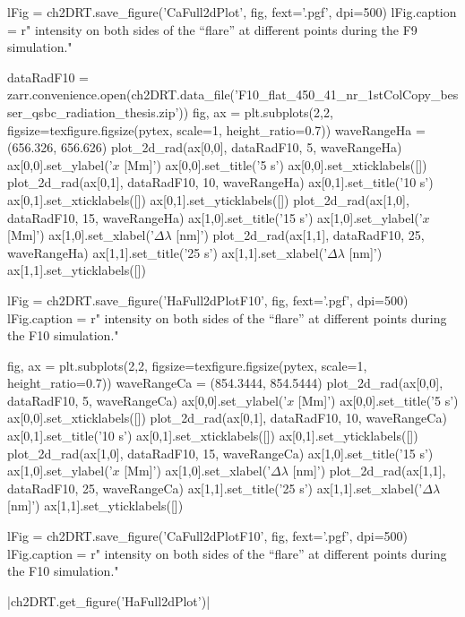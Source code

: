 \begin{pycode}[2DRT]
lFig = ch2DRT.save_figure('CaFull2dPlot', fig, fext='.pgf', dpi=500)
lFig.caption = r"\CaLine{} intensity on both sides of the ``flare'' at different points during the F9 simulation."

dataRadF10 = zarr.convenience.open(ch2DRT.data_file('F10_flat_450_41_nr_1stColCopy_besser_qsbc_radiation_thesis.zip'))
fig, ax = plt.subplots(2,2, figsize=texfigure.figsize(pytex, scale=1, height_ratio=0.7))
waveRangeHa = (656.326, 656.626)
plot_2d_rad(ax[0,0], dataRadF10, 5, waveRangeHa)
ax[0,0].set_ylabel('$x$ [Mm]')
ax[0,0].set_title('5 s')
ax[0,0].set_xticklabels([])
plot_2d_rad(ax[0,1], dataRadF10, 10, waveRangeHa)
ax[0,1].set_title('10 s')
ax[0,1].set_xticklabels([])
ax[0,1].set_yticklabels([])
plot_2d_rad(ax[1,0], dataRadF10, 15, waveRangeHa)
ax[1,0].set_title('15 s')
ax[1,0].set_ylabel('$x$ [Mm]')
ax[1,0].set_xlabel('$\Delta\lambda$ [nm]')
plot_2d_rad(ax[1,1], dataRadF10, 25, waveRangeHa)
ax[1,1].set_title('25 s')
ax[1,1].set_xlabel('$\Delta\lambda$ [nm]')
ax[1,1].set_yticklabels([])

lFig = ch2DRT.save_figure('HaFull2dPlotF10', fig, fext='.pgf', dpi=500)
lFig.caption = r"\Ha{} intensity on both sides of the ``flare'' at different points during the F10 simulation."

fig, ax = plt.subplots(2,2, figsize=texfigure.figsize(pytex, scale=1, height_ratio=0.7))
waveRangeCa = (854.3444, 854.5444)
plot_2d_rad(ax[0,0], dataRadF10, 5, waveRangeCa)
ax[0,0].set_ylabel('$x$ [Mm]')
ax[0,0].set_title('5 s')
ax[0,0].set_xticklabels([])
plot_2d_rad(ax[0,1], dataRadF10, 10, waveRangeCa)
ax[0,1].set_title('10 s')
ax[0,1].set_xticklabels([])
ax[0,1].set_yticklabels([])
plot_2d_rad(ax[1,0], dataRadF10, 15, waveRangeCa)
ax[1,0].set_title('15 s')
ax[1,0].set_ylabel('$x$ [Mm]')
ax[1,0].set_xlabel('$\Delta\lambda$ [nm]')
plot_2d_rad(ax[1,1], dataRadF10, 25, waveRangeCa)
ax[1,1].set_title('25 s')
ax[1,1].set_xlabel('$\Delta\lambda$ [nm]')
ax[1,1].set_yticklabels([])

lFig = ch2DRT.save_figure('CaFull2dPlotF10', fig, fext='.pgf', dpi=500)
lFig.caption = r"\CaLine{} intensity on both sides of the ``flare'' at different points during the F10 simulation."
\end{pycode}

\py[2DRT]|ch2DRT.get_figure('HaFull2dPlot')|

